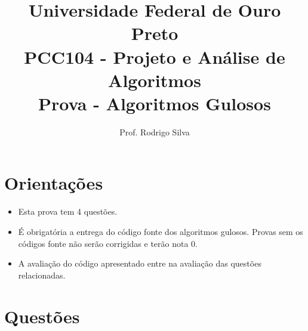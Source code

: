 \documentclass{article}
\title{\vspace{-2 cm}Universidade Federal de Ouro Preto \\ PCC104 - Projeto e Análise de Algoritmos \\ Prova - Algoritmos Gulosos}
\author{Prof. Rodrigo Silva}
\begin{document}
\maketitle

\section*{Orientações}

\begin{itemize}
    \item Esta prova tem 4 questões.
    \item É obrigatória a entrega do código fonte dos algoritmos gulosos. Provas sem os códigos fonte não serão corrigidas e terão nota 0.
    \item A avaliação do código apresentado entre na avaliação das questões relacionadas. 
\end{itemize}

\section*{Questões}
\end{document}
